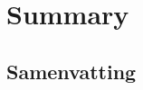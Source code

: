 

\cleardoublepage\thispagestyle{empty}
\chapter*{Summary}

\cleardoublepage\thispagestyle{empty}
\begin{otherlanguage}{dutch}
\chapter*{Samenvatting}

\end{otherlanguage}

\backmatter
\hypersetup{urlcolor=darkgreen}
\printbibliography  %
\hypersetup{urlcolor=darkblue}
%


